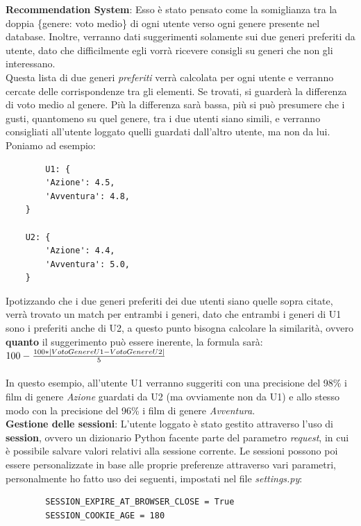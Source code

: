 \documentclass[12pt]{article}
\begin{document}
	\noindent \textbf{Recommendation System}: Esso è stato pensato come la somiglianza tra la doppia \{genere: voto medio\} di ogni utente verso ogni genere presente nel database.
	Inoltre, verranno dati suggerimenti solamente sui due generi preferiti da utente, dato che difficilmente egli vorrà ricevere consigli su generi che non gli interessano. \\Questa lista di due generi \textit{preferiti} verrà calcolata per ogni utente e verranno cercate delle corrispondenze tra gli elementi. Se trovati, si guarderà la differenza di voto medio al genere. Più la differenza sarà bassa, più si può presumere che i gusti, quantomeno su quel genere, tra i due utenti siano simili, e verranno consigliati all'utente loggato quelli guardati dall'altro utente, ma non da lui. \\
	Poniamo ad esempio:
	\begin{verbatim}
		U1: {
		'Azione': 4.5,
		'Avventura': 4.8,
	}

	U2: {
		'Azione': 4.4,
		'Avventura': 5.0,
	}
	\end{verbatim}

	\noindent Ipotizzando che i due generi preferiti dei due utenti siano quelle sopra citate, verrà trovato un match per entrambi i generi, dato che entrambi i generi di U1 sono i preferiti anche di U2, a questo punto bisogna calcolare la similarità, ovvero \textbf{quanto} il suggerimento può essere inerente, la formula sarà: \\
	
	$100 - {100 * |VotoGenereU1-VotoGenereU2| \over 5}$ \\ \\
	
	\noindent In questo esempio, all'utente U1 verranno suggeriti con una precisione del 98\% i film di genere \textit{Azione} guardati da U2 (ma ovviamente non da U1) e allo stesso modo con la precisione del 96\% i film di genere \textit{Avventura}. \\
	
	
	
	\noindent \textbf{Gestione delle sessioni}: L'utente loggato è stato gestito attraverso l'uso di \textbf{session}, ovvero un dizionario Python facente parte del parametro \textit{request}, in cui è possibile salvare valori relativi alla sessione corrente.
	Le sessioni possono poi essere personalizzate in base alle proprie preferenze attraverso vari parametri, personalmente ho fatto uso dei seguenti, impostati nel file \textit{settings.py}:
	\begin{verbatim}
		SESSION_EXPIRE_AT_BROWSER_CLOSE = True
		SESSION_COOKIE_AGE = 180
	\end{verbatim}
	
\end{document}
